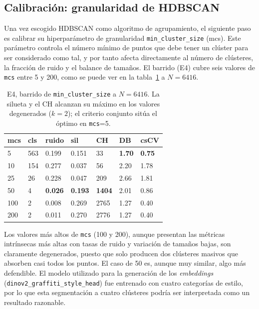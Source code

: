 \subsection{Calibración: granularidad de HDBSCAN}
\label{subsubsec:res-mincluster}
Una vez escogido HDBSCAN como algoritmo de agrupamiento, el siguiente paso es
calibrar su hiperparámetro de granularidad \texttt{min\_cluster\_size} (mcs).
Este parámetro controla el número mínimo de puntos que debe tener un clúster
para ser considerado como tal, y por tanto afecta directamente al número de
clústeres, la fracción de ruido y el balance de tamaños. El barrido (E4) cubre
seis valores de \texttt{mcs} entre 5 y 200, como se puede ver en la
tabla~\ref{tab:e4-mcs-6416} a $N=6416$.

\begin{table}[h]
\caption[E4, barrido de \texttt{min\_cluster\_size} a $N=6416$]{E4, barrido de \texttt{min\_cluster\_size} a $N=6416$. La silueta y
el CH alcanzan su máximo en los valores degenerados ($k{=}2$); el criterio
conjunto sitúa el óptimo en \texttt{mcs}=5. \glosacalidad}
\label{tab:e4-mcs-6416}
\centering
{\footnotesize
\begin{tabular}{|p{1.4cm}|p{1.0cm}|p{1.0cm}|p{1.0cm}|p{1.2cm}|p{1.0cm}|p{1.0cm}|} \hline
  \textbf{mcs} & \textbf{cls} & \textbf{ruido} & \textbf{sil} & \textbf{CH} & \textbf{DB} & \textbf{csCV} \\ \hline
    5 & 563 & 0.199 & 0.151 &   33 & \textbf{1.70} & \textbf{0.75} \\ \hline
   10 & 154 & 0.277 & 0.037 &   56 & 2.20 & 1.78 \\ \hline
   25 &  26 & 0.228 & 0.047 &  209 & 2.66 & 1.81 \\ \hline
   50 &   4 & \textbf{0.026} & \textbf{0.193} & \textbf{1404} & 2.01 & 0.86 \\ \hline
  100 &   2 & 0.008 & 0.269 & 2765 & 1.27 & 0.40 \\ \hline
  200 &   2 & 0.011 & 0.270 & 2776 & 1.27 & 0.40 \\ \hline
\end{tabular}
}
\end{table}

Los valores más altos de \texttt{mcs} (100 y 200), aunque presentan las
métricas intrínsecas más altas con tasas de ruido y variación de tamaños bajas,
son claramente degenerados, puesto que solo producen dos clústeres masivos que
absorben casi todos los puntos. El caso de 50 es, aunque muy similar, algo más
defendible. El modelo utilizado para la generación de los \textit{embeddings}
(\texttt{dinov2\_graffiti\_style\_head}) fue entrenado con cuatro categorías de
estilo, por lo que esta segmentación a cuatro clústeres podría ser interpretada
como un resultado razonable.

